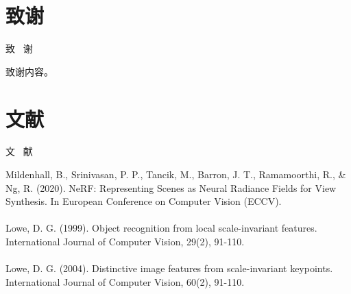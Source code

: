 \documentclass{nwputhesis}
\begin{document}
\makespace
\section*{致谢}
\begin{center}
    { \blackti \fontsize{16.0600pt}{1.25}致 \, 谢}
\end{center}
致谢内容。

\makespace
\section*{文献}
\begin{center}
    { \blackti \fontsize{16.0600pt}{1.25}文 \, 献}
\end{center}
\noindent
Mildenhall, B., Srinivasan, P. P., Tancik, M., Barron, J. T., Ramamoorthi, R., \& Ng, R. (2020). NeRF: 
Representing Scenes as Neural Radiance Fields for View Synthesis. In European Conference on Computer Vision 
(ECCV).\\\\
Lowe, D. G. (1999). Object recognition from local scale-invariant features. International Journal of Computer Vision, 29(2), 91-110.\\\\
Lowe, D. G. (2004). Distinctive image features from scale-invariant keypoints. International Journal of Computer Vision, 60(2), 91-110.\\\\
\end{document}
